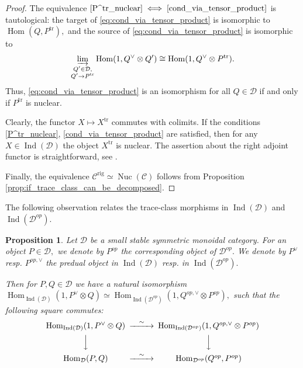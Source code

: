 \documentclass[11pt,leqno]{amsart}
\newcommand{\Iff}[2]{$\text{\ref{#1}}\iff\text{\ref{#2}}$}
\newtheorem{prop}[theo]{Proposition}
\numberwithin{equation}{section}
\def\Hom{\operatorname{Hom}}
\newcommand{\indlim}[1][]{\mathop{\varinjlim}\limits_{#1}}
\newcommand{\rig}{\operatorname{rig}}
\newcommand{\Nuc}{\operatorname{Nuc}}
\newcommand{\cD}{{\mathcal D}}
\newcommand{\cC}{{\mathcal C}}
\newcommand{\tr}{\operatorname{tr}}
\newcommand{\Ind}{\operatorname{Ind}}
\begin{document}
\begin{proof}
The equivalence \Iff{P^tr_nuclear}{cond_via_tensor_product} is tautological: the target of \eqref{eq:cond_via_tensor_product} is isomorphic to $\Hom(Q,P^{\tr}),$ and the source of \eqref{eq:cond_via_tensor_product} is isomorphic to
\begin{equation*}
\indlim[\substack{Q'\in\cD,\\ Q'\to P^{\tr}}]\Hom(1,Q^{\vee}\otimes Q')\cong\Hom(1,Q^{\vee}\otimes P^{\tr}).
\end{equation*}
Thus, \eqref{eq:cond_via_tensor_product} is an isomorphism for all $Q\in\cD$ if and only if $P^{\tr}$ is nuclear.

Clearly, the functor $X\mapsto X^{\tr}$ commutes with colimits. If the conditions \ref{P^tr_nuclear}, \ref{cond_via_tensor_product} are satisfied, then for any $X\in\Ind(\cD)$ the object $X^{\tr}$ is nuclear. The assertion about the right adjoint functor is straightforward, see \cite[Proof of Lemma 3.32]{AM24}. 

Finally, the equivalence $\cC^{\rig}\simeq\Nuc(\cC)$ follows from Proposition \ref{prop:if_trace_class_can_be_decomposed}.
\end{proof}

The following observation relates the trace-class morphisms in $\Ind(\cD)$ and $\Ind(\cD^{op}).$

\begin{prop}\label{prop:trace_class_after_taking_opposite}
	Let $\cD$ be a small stable symmetric monoidal category. For an object $P\in\cD,$ we denote by $P^{op}$ the corresponding object of $\cD^{op}.$ We denote by $P^{\vee}$ resp. $P^{op,\vee}$ the predual object in $\Ind(\cD)$ resp. in $\Ind(\cD^{op}).$
	
	Then for $P,Q\in\cD$ we have a natural isomorphism $\Hom_{\Ind(\cD)}(1,P^{\vee}\otimes Q)\simeq\Hom_{\Ind(\cD^{op})}(1,Q^{op,\vee}\otimes P^{op}),$ such that the following square commutes:
	\begin{equation}\label{eq:comm_square_for_trace_class}
		\begin{CD}
			\Hom_{\Ind(\cD)}(1,P^{\vee}\otimes Q) @>{\sim}>> \Hom_{\Ind(\cD^{op})}(1,Q^{op,\vee}\otimes P^{op})\\
			@VVV @VVV\\
			\Hom_{\cD}(P,Q) @>{\sim}>> \Hom_{\cD^{op}}(Q^{op},P^{op})
		\end{CD}
	\end{equation}
\end{prop}
\end{document}
